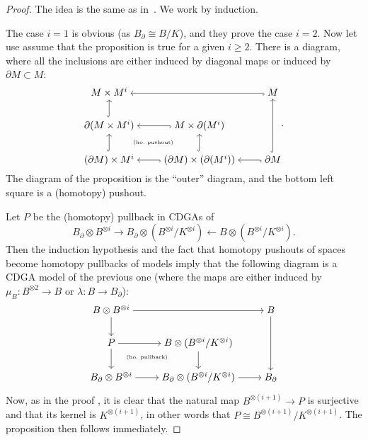\begin{proof}
  The idea is the same as in~\cite[Proposition~5.1]{CordovaBulensLambrechtsStanley2015a}.
  We work by induction.

  The case $i = 1$ is obvious (as $B_{\partial} \cong B/K$), and they prove the case $i = 2$.
  Now let use assume that the proposition is true for a given $i \geq 2$.
  There is a diagram, where all the inclusions are either induced by diagonal maps or induced by $\partial M \subset M$:
  \[ \begin{tikzcd}[cramped]
      M \times M^{i} && M \ar[ll, hook] \\
      \partial(M \times M^{i}) \ar[u, hook] & M \times \partial(M^{i}) \ar[l, hook] \\
      (\partial M) \times M^{i} \ar[u, hook] & (\partial M) \times (\partial(M^{i})) \ar[l, hook] \ar[u, hook] \ar[ul, phantom, "\text{\tiny (ho.\ pushout)}"] & \partial M \ar[l, hook] \ar[uu, hook]
    \end{tikzcd}. \]
  The diagram of the proposition is the ``outer'' diagram, and the bottom left square is a (homotopy) pushout.

  Let $P$ be the (homotopy) pullback in CDGAs of
  \[ B_{\partial} \otimes B^{\otimes i} \to B_{\partial} \otimes (B^{\otimes i} / K^{\otimes i}) \gets B \otimes (B^{\otimes i} / K^{\otimes i}). \]
  Then the induction hypothesis and the fact that homotopy pushouts of spaces become homotopy pullbacks of models imply that the following diagram is a CDGA model of the previous one (where the maps are either induced by $\mu_{B} : B^{\otimes 2} \to B$ or $\lambda : B \to B_{\partial}$):
  \[ \begin{tikzcd}[cramped]
      B \otimes B^{\otimes i} && B \ar[ll, leftarrow] \\
      P \ar[u, leftarrow] & B \otimes (B^{\otimes i} / K^{\otimes i}) \ar[l, leftarrow] \\
      B_{\partial} \otimes B^{\otimes i} \ar[u, leftarrow] & B_{\partial} \otimes (B^{\otimes i} / K^{\otimes i}) \ar[l, leftarrow] \ar[u, leftarrow] \ar[ul, phantom, "\text{\tiny (ho.\ pullback)}"] & B_{\partial} \ar[l, leftarrow] \ar[uu, leftarrow]
    \end{tikzcd} \]

  Now, as in the proof \cite[Lemma~5.3]{CordovaBulensLambrechtsStanley2015a}, it is clear that the natural map $B^{\otimes (i+1)} \to P$ is surjective and that its kernel is $K^{\otimes(i+1)}$, in other words that $P \cong B^{\otimes(i+1)} / K^{\otimes(i+1)}$.
  The proposition then follows immediately.
\end{proof}

